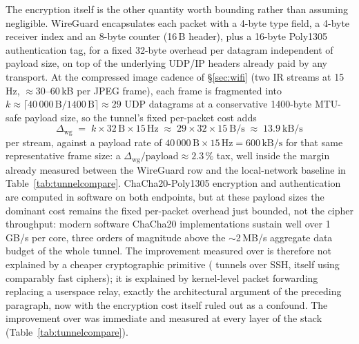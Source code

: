 The encryption itself is the other quantity worth bounding rather than
assuming negligible. WireGuard encapsulates each packet with a 4-byte type
field, a 4-byte receiver index and an 8-byte counter (16\,B header), plus a
16-byte Poly1305 authentication tag, for a fixed 32-byte overhead per
datagram independent of payload size, on top of the underlying UDP/IP
headers already paid by any transport. At the compressed image cadence of
\S\ref{sec:wifi} (two IR streams at 15\,Hz, $\approx$30--60\,kB per JPEG
frame), each frame is fragmented into $k \approx \lceil
40\,000\,\text{B}/1400\,\text{B}\rceil \approx 29$ UDP datagrams at a
conservative 1400-byte MTU-safe payload size, so the tunnel's fixed
per-packet cost adds
\begin{equation}
\Delta_{\mathrm{wg}} \;=\; k \times 32\,\text{B} \times 15\,\text{Hz}
\;\approx\; 29 \times 32 \times 15\ \text{B/s} \;\approx\; 13.9\ \text{kB/s}
\end{equation}
per stream, against a payload rate of $40\,000\,\text{B} \times 15\,\text{Hz}
= 600\,\text{kB/s}$ for that same representative frame size: a
$\Delta_{\mathrm{wg}}/\text{payload} \approx 2.3\,\%$ tax, well inside the
margin already measured between the WireGuard row and the local-network
baseline in Table~\ref{tab:tunnelcompare}. ChaCha20-Poly1305
encryption and authentication are computed in software on both endpoints,
but at these payload sizes the dominant cost remains the fixed per-packet
overhead just bounded, not the cipher throughput: modern software ChaCha20
implementations sustain well over 1\,GB/s per core, three orders of
magnitude above the $\sim$2\,MB/s aggregate data budget of the whole tunnel.
The improvement measured over  is therefore not explained by
a cheaper cryptographic primitive ( tunnels over SSH, itself
using comparably fast ciphers); it is explained by kernel-level packet
forwarding replacing a userspace relay, exactly the architectural argument
of the preceding paragraph, now with the encryption cost itself ruled out as
a confound.
The improvement over  was immediate and measured at every
layer of the stack (Table~\ref{tab:tunnelcompare}).

